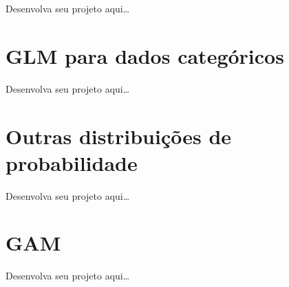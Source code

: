 \documentclass[
]{book}
\begin{document}
Desenvolva seu projeto aqui\ldots{}

\chapter{GLM para dados categóricos}\label{glm-para-dados-categuxf3ricos}

Desenvolva seu projeto aqui\ldots{}

\chapter{Outras distribuições de probabilidade}\label{outras-distribuiuxe7uxf5es-de-probabilidade}

Desenvolva seu projeto aqui\ldots{}

\chapter{GAM}\label{gam}

Desenvolva seu projeto aqui\ldots{}

  
\end{document}
